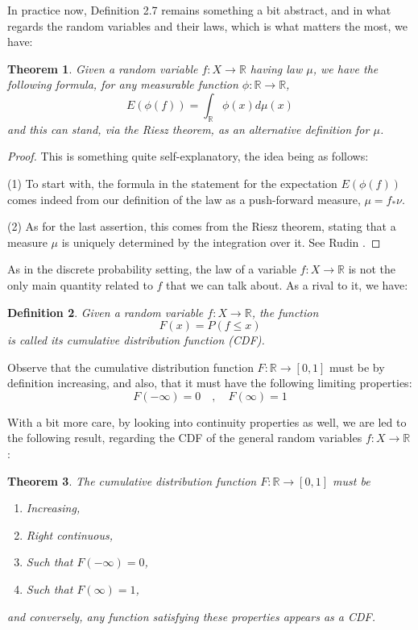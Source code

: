 \documentclass[12pt]{amsbook}
\newtheorem{theorem}{Theorem}[chapter]
\newtheorem{definition}[theorem]{Definition}
\begin{document}
\bigskip

In practice now, Definition 2.7 remains something a bit abstract, and in what regards the random variables and their laws, which is what matters the most, we have:

\begin{theorem}
Given a random variable $f:X\to\mathbb R$ having law $\mu$, we have the following formula, for any measurable function $\phi:\mathbb R\to\mathbb R$,
$$E(\phi(f))=\int_\mathbb R\phi(x)d\mu(x)$$
and this can stand, via the Riesz theorem, as an alternative definition for $\mu$.
\end{theorem}

\begin{proof}
This is something quite self-explanatory, the idea being as follows:

\medskip

(1) To start with, the formula in the statement for the expectation $E(\phi(f))$ comes indeed from our definition of the law as a push-forward measure, $\mu=f_*\nu$.

\medskip

(2) As for the last assertion, this comes from the Riesz theorem, stating that a measure $\mu$ is uniquely determined by the integration over it. See Rudin \cite{rud}.
\end{proof}

As in the discrete probability setting, the law of a variable $f:X\to\mathbb R$ is not the only main quantity related to $f$ that we can talk about. As a rival to it, we have:


\begin{definition}
Given a random variable $f:X\to\mathbb R$, the function
$$F(x)=P(f\leq x)$$
is called its cumulative distribution function (CDF).
\end{definition}

Observe that the cumulative distribution function $F:\mathbb R\to[0,1]$ must be by definition increasing, and also, that it must have the following limiting properties:
$$F(-\infty)=0\quad,\quad F(\infty)=1$$

With a bit more care, by looking into continuity properties as well, we are led to the following result, regarding the CDF of the general random variables $f:X\to\mathbb R$:


\begin{theorem}
The cumulative distribution function $F:\mathbb R\to[0,1]$ must be
\begin{enumerate}
\item Increasing,

\item Right continuous,

\item Such that $F(-\infty)=0$,

\item Such that $F(\infty)=1$,
\end{enumerate}
and conversely, any function satisfying these properties appears as a CDF.
\end{theorem}
\end{document}

